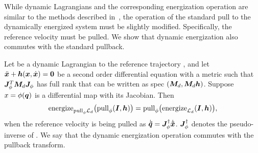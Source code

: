 While dynamic Lagrangians and the corresponding energization operation are similar to the
methods described in~\cite{Ratliff2020}, the operation of the standard pull to the
dynamically energized system must be slightly modified. Specifically, the reference
velocity must be pulled. We show that dynamic
energization also commutes with the standard pullback.

\begin{theorem}
Let \ld{} be a dynamic Lagrangian to the reference trajectory \xt{}, and
let~{$\ddot{\bm{x}}+\bm{h}(\bm{x}, \dot{\bm{x}}) = \bm{0}$} be a second order differential equation with a metric \Md{}
such that $\bm{J}^T_{\phi}\bm{M}_d\bm{J}_{\phi}$ has full rank that can be written as spec $(\bm{M}_d, \bm{M}_d\bm{h})$. Suppose $x =
\phi(\bm{q})$ is a differential map with \J{} its Jacobian. Then
\begin{equation}
  \textrm{energize}_{\textrm{pull}_{\phi}{\mathcal{L}_d}}{\left(\textrm{pull}_{\phi}{(\bm{I}, \bm{h})}\right)} =
\textrm{pull}_{\phi}{\left(\textrm{energize}_{\mathcal{L}_d}{(\bm{I},\bm{h})}\right)}, 
\end{equation}
when the reference velocity is being pulled as $\dot{\bm{\tilde{q}}} = \bm{J}_{\phi}^{\dagger}\dot{\bm{\tilde{x}}}$.
$\bm{J}_{\phi}^{\dagger}$ denotes the pseudo-inverse of \J{}.
%
We say that the dynamic energization operation commutes with the pullback transform.
\end{theorem}

